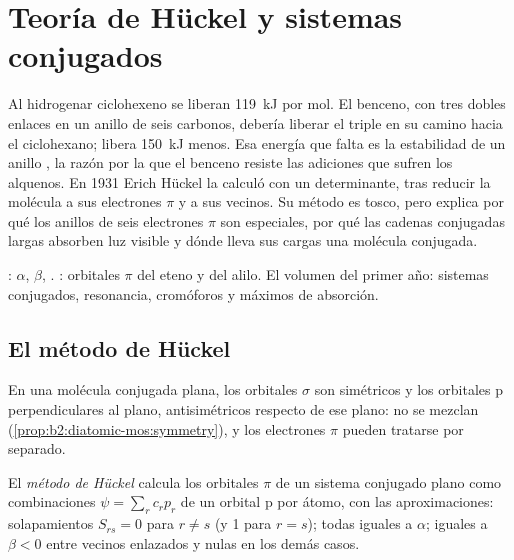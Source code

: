\chapter{Teoría de Hückel y sistemas conjugados}\label{ch:b2:huckel}

Al hidrogenar ciclohexeno se liberan \qty{119}{kJ} por mol. El benceno,
con tres dobles enlaces en un anillo de seis carbonos, debería liberar el triple
en su camino hacia el ciclohexano; libera \qty{150}{kJ} menos. Esa energía que
falta es la estabilidad de un anillo , la razón por la que el benceno resiste
las adiciones que sufren los alquenos. En 1931 Erich Hückel la calculó con un
determinante, tras reducir la molécula a sus electrones $\pi$ y a sus
vecinos. Su método es tosco, pero explica por qué los anillos de seis electrones $\pi$
son especiales, por qué las cadenas conjugadas largas absorben luz visible y
dónde lleva sus cargas una molécula conjugada.

\begin{recall}
:  $\alpha$,  $\beta$,
. : orbitales $\pi$ del eteno y del
alilo. El volumen del primer año: sistemas conjugados, resonancia, cromóforos y
máximos de absorción.
\end{recall}

\section{El método de Hückel}

En una molécula conjugada plana, los orbitales $\sigma$ son simétricos y los orbitales p
perpendiculares al plano, antisimétricos respecto de ese plano: no se
mezclan (\cref{prop:b2:diatomic-mos:symmetry}), y los electrones $\pi$ pueden
tratarse por separado.

\begin{definition}\label{def:b2:huckel:method}
El \emph{método de Hückel} calcula los orbitales $\pi$ de un
sistema conjugado plano como combinaciones $\psi = \sum_r c_r p_r$ de un orbital p por
átomo, con las aproximaciones: solapamientos $S_{rs} = 0$ para $r \neq s$ (y 1 para $r =
s$);  todas iguales a $\alpha$;  iguales a $\beta < 0$
entre vecinos enlazados y nulas en los demás casos.
\end{definition}

